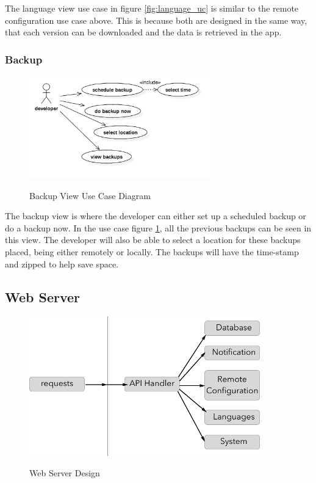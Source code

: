 The language view use case in figure \ref{fig:language_uc} is similar to the remote configuration use case above. This is because both are designed in the same way, that each version can be downloaded and the data is retrieved in the app.

\subsubsection{Backup} \label{d-db:backup}

\begin{figure}[!h]
    \caption{Backup View Use Case Diagram}
    \centering
    \includegraphics[width=80mm]{images/use_cases/backup_uc}
    \label{fig:backup_uc}
\end{figure}

The backup view is where the developer can either set up a scheduled backup or do a backup now. In the use case figure \ref{fig:backup_uc}, all the previous backups can be seen in this view. The developer will also be able to select a location for these backups placed, being either remotely or locally. The backups will have the time-stamp and zipped to help save space.

\subsection{Web Server} \label{d-web_server}

\begin{figure}[!h]
    \caption{Web Server Design}
    \centering
    \includegraphics[width=100mm]{images/design/api_handler}
    \label{fig:api_handler}
\end{figure}


